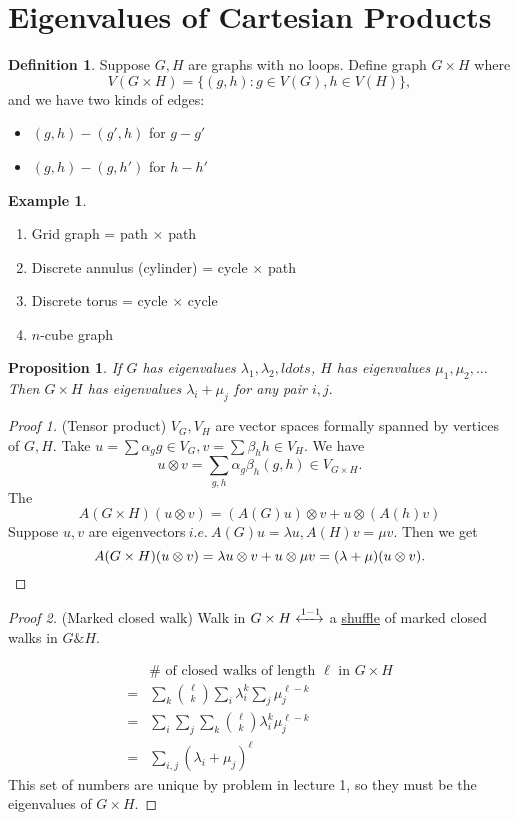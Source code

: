 \documentclass{report}
\newcommand{\ie}{\ i.e.\ }
\newtheorem{proposition}{Proposition}[section]
\theoremstyle{definition}
\newtheorem{definition}{Definition}[section]
\newtheorem{example}{Example}[section]
\theoremstyle{remark}
\numberwithin{equation}{section}
\begin{document}
\section{Eigenvalues of Cartesian Products}
\begin{definition}
Suppose $G, H$ are graphs with no loops. Define graph $G \times H$ where \[V(G \times H) = \{(g, h) : g \in V(G), h \in V(H)\},\]
and we have two kinds of edges:
\begin{itemize}
\item $(g, h) - (g', h)$ for $g - g'$
\item $(g, h) - (g, h')$ for $h - h'$
\end{itemize}
\end{definition}
\begin{example}
\begin{enumerate}
\item Grid graph = path $\times$ path
\item Discrete annulus
(cylinder) = cycle $\times$ path
\item Discrete torus = cycle $\times$ cycle
\item $n$-cube graph
\end{enumerate}
\end{example}
\begin{proposition}
If $G$ has eigenvalues $\lambda_1, \lambda_2, ldots$, $H$ has eigenvalues $\mu_1, \mu_2, \ldots$ Then $G \times H$ has eigenvalues $\lambda_i + \mu_j$ for any pair $i, j.$
\end{proposition}
\begin{proof}[Proof 1](Tensor product)
$V_G, V_H$ are vector spaces formally spanned by vertices of $G, H.$ Take $u = \sum \alpha_g g \in V_G, v = \sum \beta_h h \in V_H.$ We have
\[u \otimes v = \sum_{g, h} \alpha_g\beta_h(g, h) \in V_{G \times H}.\]
The 
\[
A(G \times H)(u \otimes v) = (A(G)u) \otimes v + u \otimes (A(h)v)
\]
Suppose $u, v$ are eigenvectors$\ie A(G)u = \lambda u, A(H)v = \mu v.$ Then we get
\[
A(G \times H)(u \otimes v) = \lambda u \otimes v + u \otimes \mu v = (\lambda+\mu)(u \otimes v). \qedhere
\]
\end{proof}

\begin{proof}[Proof 2](Marked closed walk)
Walk in $G \times H \xleftrightarrow[]{1-1}$ a \underline{shuffle} of marked closed walks in $G \& H.$

\begin{align*}
& \# \text{ of closed walks of length $\ell$ in $G \times H$} \\
= & \sum_{k} \binom{\ell}{k} \sum_i \lambda_i^k\sum_j \mu_j^{\ell - k} \\
= & \sum_i \sum_j \sum_k \binom{\ell}{k} \lambda_i^{k} \mu_j^{\ell - k} \\
= & \sum_{i, j} (\lambda_i + \mu_j)^\ell
\end{align*}
This set of numbers are unique by problem in lecture 1, so they must be the eigenvalues of $G \times H.$
\end{proof}
\end{document}
